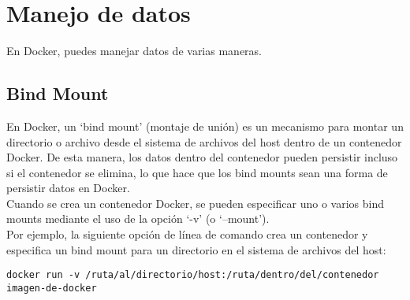 \documentclass{article}
\begin{document}
\newpage
\section{Manejo de datos}
En Docker, puedes manejar datos de varias maneras.

\subsection{Bind Mount}

En Docker, un \enquote*{bind mount} (montaje de unión) es un mecanismo para montar un directorio o archivo desde el sistema de archivos del host dentro de un contenedor Docker. De esta manera, los datos dentro del contenedor pueden persistir incluso si el contenedor se elimina, lo que hace que los bind mounts sean una forma de persistir datos en Docker.
\\
Cuando se crea un contenedor Docker, se pueden especificar uno o varios bind mounts mediante el uso de la opción \enquote*{-v} (o \enquote*{--mount}).\\ Por ejemplo, la siguiente opción de línea de comando crea un contenedor y especifica un bind mount para un directorio en el sistema de archivos del host:
\begin{lstlisting}[numbers=none]
      docker run -v /ruta/al/directorio/host:/ruta/dentro/del/contenedor imagen-de-docker
\end{lstlisting}
\end{document}
